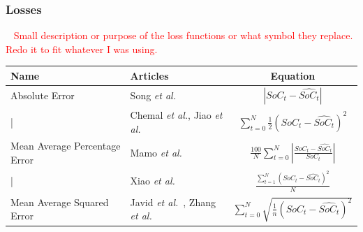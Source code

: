 \subsubsection{Losses}~\label{subsub:losses}
\textcolor{red}{Small description or purpose of the loss functions or what symbol they replace. Redo it to fit whatever I was using.} \\
    \begin{tabular}{ l l c }
        \hline
        Name & Articles & Equation \\ 
        \hline
        Absolute Error & Song \textit{et al.}~\cite{song_lithium-ion_2018} & $|SoC_t-\hat{SoC_t}|$ \\
        \hline
        | & Chemal \textit{et al.}\cite{Chemali2017}, Jiao \textit{et al.}~\cite{jiao_gru-rnn_2020} & $\sum\limits^N_{t=0} \frac{1}{2} (SoC_t-\hat{SoC_t})^2$ \\
        \hline
        Mean Average Percentage Error & Mamo \textit{et al.}~\cite{mamo_long_2020} & $\frac{100}{N}\sum\limits^N_{t=0}|\frac{SoC_t-\hat{SoC_t}}{SoC_t}|$ \\
        \hline
        | & Xiao \textit{et al.}~\cite{xiao_accurate_2019} & $\frac{\sum\limits^N_{t=1}(SoC_t-\hat{SoC_t})^2}{N}$ \\
        \hline
        Mean Average Squared Error & Javid \textit{et al.}~\cite{javid_adaptive_2020}, Zhang \textit{et al.}~\cite{zhang_deep_2020} & $\sum\limits^N_{t=0} \sqrt{\frac{1}{n} (SoC_t-\hat{SoC_t})^2}$ \\
        \hline
    \end{tabular}
\newline
